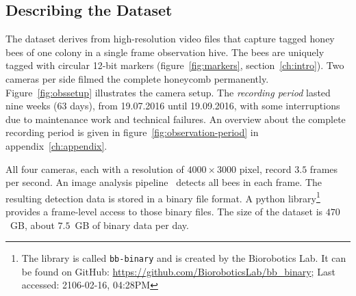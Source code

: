 \subsection{Describing the Dataset}
\label{sec:dataset}
The dataset derives from high-resolution video files that capture tagged honey bees of one colony in a single frame observation hive.
The bees are uniquely tagged with circular 12-bit markers (figure~\ref{fig:markers}, section~\ref{ch:intro}).
Two cameras per side filmed the complete honeycomb permanently.
Figure~\ref{fig:obssetup} illustrates the camera setup.
The \emph{recording period} lasted nine weeks (63 days), from 19.07.2016 until 19.09.2016, with some interruptions due to maintenance work and technical failures. An overview about the complete recording period is given in figure~\ref{fig:observation-period} in appendix~\ref{ch:appendix}.

All four cameras, each with a resolution of $4000\times3000$ pixel, record $3.5$ frames per second. 
An image analysis pipeline~\cite{wario2015automatic} detects all bees in each frame.
The resulting detection data is stored in a binary file format.
A python library\footnote{The library is called \texttt{bb-binary} and is created by the Biorobotics Lab. It can be found on GitHub: \url{https://github.com/BioroboticsLab/bb_binary}; Last accessed: 2106-02-16, 04:28PM} provides a frame-level access to those binary files.
The size of the dataset is $470$~GB, about $7.5$~GB of binary data per day.

